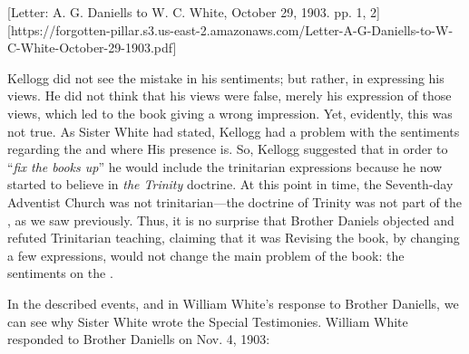 
[Letter: A. G. Daniells to W. C. White, October 29, 1903. pp. 1, 2][https://forgotten-pillar.s3.us-east-2.amazonaws.com/Letter-A-G-Daniells-to-W-C-White-October-29-1903.pdf]

Kellogg did not see the mistake in his sentiments; but rather, in expressing his views. He did not think that his views were false, merely his expression of those views, which led to the book giving a wrong impression. Yet, evidently, this was not true. As Sister White had stated, Kellogg had a problem with the sentiments regarding the  and where His presence is. So, Kellogg suggested that in order to “\textit{fix the books up}” he would include the trinitarian expressions because he now started to believe in \textit{the Trinity} doctrine. At this point in time, the Seventh-day Adventist Church was not trinitarian—the doctrine of Trinity was not part of the , as we saw previously. Thus, it is no surprise that Brother Daniels objected and refuted Trinitarian teaching, claiming that it was Revising the book, by changing a few expressions, would not change the main problem of the book: the sentiments on the . 

In the described events, and in William White's response to Brother Daniells, we can see why Sister White wrote the Special Testimonies. William White responded to Brother Daniells on Nov. 4, 1903:




